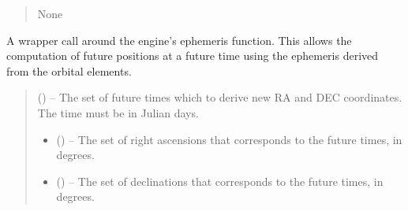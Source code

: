\documentclass[letterpaper,11pt,english]{sphinxmanual}
\begin{document}
\begin{savenotes}
\begin{fulllineitems}
\begin{savenotes}
\begin{fulllineitems}
\begin{quote}
\begin{description}
\sphinxAtStartPar
None

\end{description}\end{quote}

\end{fulllineitems}\end{savenotes}


\begin{savenotes}\begin{fulllineitems}
\label{\detokenize{code/opihiexarata.ephemeris.solution:opihiexarata.ephemeris.solution.EphemeriticSolution.forward_ephemeris}}
\pysigstartsignatures
{}
\pysigstopsignatures
\sphinxAtStartPar
A wrapper call around the engine’s ephemeris function. This
allows the computation of future positions at a future time using
the ephemeris derived from the orbital elements.
\begin{quote}\begin{description}
\sphinxAtStartPar
{} () – The set of future times which to derive new RA and DEC coordinates.
The time must be in Julian days.

\sphinxAtStartPar
\begin{itemize}
\item {} 
\sphinxAtStartPar
{} () – The set of right ascensions that corresponds to the future times,
in degrees.

\item {} 
\sphinxAtStartPar
{} () – The set of declinations that corresponds to the future times, in
degrees.

\end{itemize}


\end{description}\end{quote}

\end{fulllineitems}\end{savenotes}


\end{fulllineitems}\end{savenotes}
\end{document}
